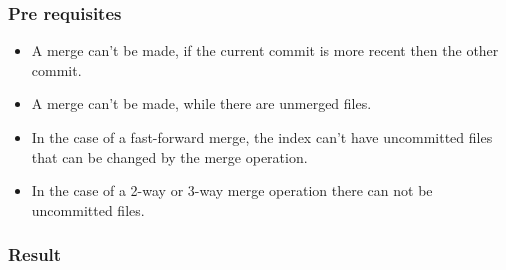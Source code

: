 \subsubsection{Pre requisites}

\begin{itemize}
\item A merge can't be made, if the current commit is more recent then the
other commit.
\item A merge can't be made, while there are unmerged files.
\item In the case of a fast-forward merge, the index can't have uncommitted
files that can be changed by the merge operation.
\item In the case of a 2-way or 3-way merge operation there can not be
uncommitted files. 
\end{itemize}

\subsubsection{Result}

